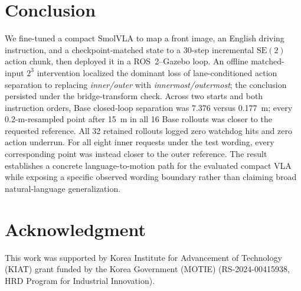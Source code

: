\documentclass[letterpaper,conference]{IEEEtran}
\newcommand{\seTwo}{\mathrm{SE}(2)}
\begin{document}
\section{Conclusion}
We fine-tuned a compact SmolVLA to map a front image, an English driving
instruction, and a checkpoint-matched state to a 30-step incremental $\seTwo$
action chunk, then deployed it in a ROS~2--Gazebo loop. An offline matched-input
$2^3$ intervention localized the dominant loss of lane-conditioned action
separation to replacing \emph{inner/outer} with
\emph{innermost/outermost}; the conclusion persisted under the bridge-transform
check. Across two starts and both
instruction orders, Base closed-loop separation was 7.376 versus 0.177~m; every
0.2-m-resampled point after 15~m in all 16 Base rollouts was closer to the
requested reference. All 32 retained rollouts logged zero watchdog hits and
zero action underrun. For all eight inner requests under the test wording, every
corresponding point was instead closer to the outer reference. The result
establishes a concrete language-to-motion path for the evaluated compact VLA
while exposing a specific observed wording boundary rather than claiming broad
natural-language generalization.

\section*{Acknowledgment}
This work was supported by Korea Institute for Advancement of Technology (KIAT)
grant funded by the Korea Government (MOTIE) (RS-2024-00415938, HRD Program for
Industrial Innovation).
\end{document}
